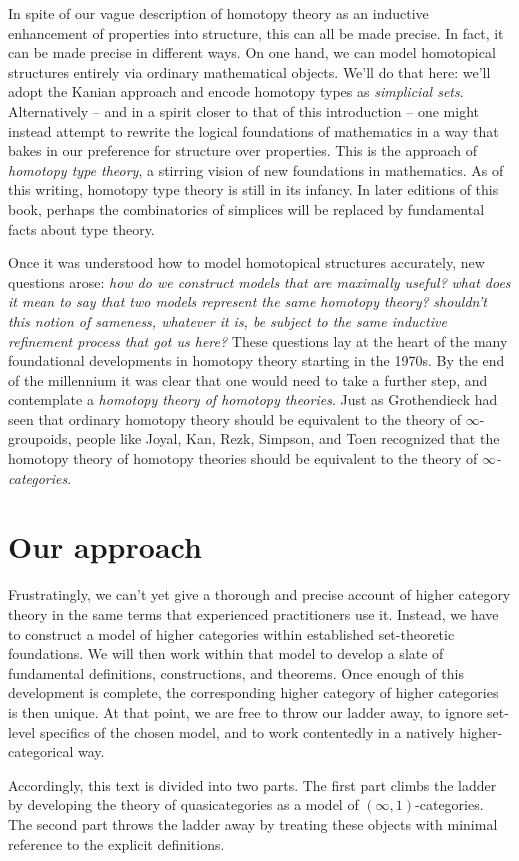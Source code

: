In spite of our vague description of homotopy theory as an inductive enhancement of properties into structure,
this can all be made precise.
In fact, it can be made precise in different ways.
On one hand, we can model homotopical structures entirely via ordinary mathematical objects.
We'll do that here: we'll adopt the Kanian approach and encode homotopy types as \emph{simplicial sets}.
Alternatively -- and in a spirit closer to that of this introduction -- one might instead attempt to rewrite the logical foundations of mathematics in a way that bakes in our preference for structure over properties.
This is the approach of \emph{homotopy type theory}, a stirring vision of new foundations in mathematics.
As of this writing, homotopy type theory is still in its infancy.
In later editions of this book, perhaps the combinatorics of simplices will be replaced by fundamental facts about type theory.

Once it was understood how to model homotopical structures accurately, new questions arose:
\emph{how do we construct models that are maximally useful?}
\emph{what does it mean to say that two models represent the same homotopy theory?}
\emph{shouldn't this notion of sameness, whatever it is, be subject to the same inductive refinement process that got us here?}
These questions lay at the heart of the many foundational developments in homotopy theory starting in the 1970s.
By the end of the millennium it was clear that one would need to take a further step, and contemplate a \emph{homotopy theory of homotopy theories}.
Just as Grothendieck had seen that ordinary homotopy theory should be equivalent to the theory of $\infty$-groupoids,
people like Joyal, Kan, Rezk, Simpson, and Toen recognized that the homotopy theory of homotopy theories should be equivalent to the theory of \emph{$\infty$-categories}.



\section*{Our approach}%
\label{sec:approach}

Frustratingly, we can't yet give a thorough and precise account of higher category theory in the same terms that experienced practitioners use it.
Instead, we have to construct a model of higher categories within established set-theoretic foundations.
We will then work within that model to develop a slate of fundamental definitions, constructions, and theorems.
Once enough of this development is complete,
the corresponding higher category of higher categories is then unique.
At that point, we are free to throw our ladder away, to ignore set-level specifics of the chosen model, and to work contentedly in a natively higher-categorical way.

Accordingly, this text is divided into two parts.
The first part climbs the ladder by developing the theory of quasicategories as a model of $(\infty,1)$-categories.
The second part throws the ladder away by treating these objects with minimal reference to the explicit definitions.
